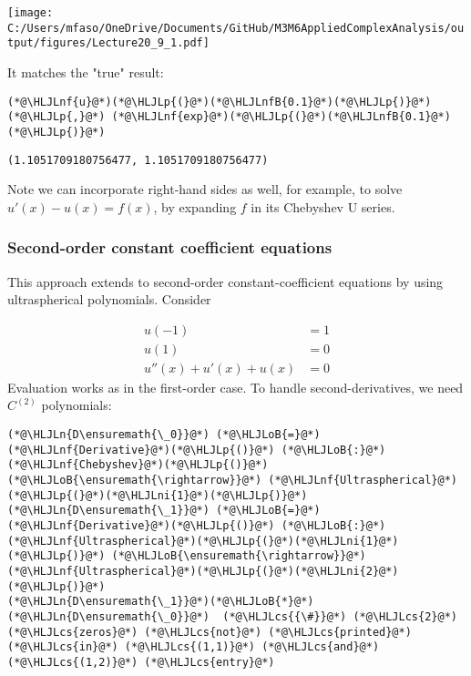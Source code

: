 \documentclass[12pt,a4paper]{article}
\newcommand{\HLJLn}[1]{#1}
\newcommand{\HLJLnf}[1]{\textcolor[RGB]{66,102,213}{#1}}
\newcommand{\HLJLnfB}[1]{\textcolor[RGB]{59,151,46}{#1}}
\newcommand{\HLJLni}[1]{\textcolor[RGB]{59,151,46}{#1}}
\newcommand{\HLJLoB}[1]{\textcolor[RGB]{102,102,102}{\textbf{#1}}}
\newcommand{\HLJLp}[1]{#1}
\newcommand{\HLJLcs}[1]{\textcolor[RGB]{153,153,119}{\textit{#1}}}
\begin{document}
\texttt{[image: C:/Users/mfaso/OneDrive/Documents/GitHub/M3M6AppliedComplexAnalysis/output/figures/Lecture20\_9\_1.pdf]}

It matches the "true" result:


\begin{lstlisting}
(*@\HLJLnf{u}@*)(*@\HLJLp{(}@*)(*@\HLJLnfB{0.1}@*)(*@\HLJLp{)}@*) (*@\HLJLp{,}@*) (*@\HLJLnf{exp}@*)(*@\HLJLp{(}@*)(*@\HLJLnfB{0.1}@*)(*@\HLJLp{)}@*)
\end{lstlisting}

\begin{lstlisting}
(1.1051709180756477, 1.1051709180756477)
\end{lstlisting}


Note we can incorporate right-hand sides as well, for example, to solve $u'(x) - u(x) = f(x)$, by expanding $f$ in its Chebyshev U series.

\subsubsection{Second-order constant coefficient equations}
This approach extends to second-order constant-coefficient equations by using ultraspherical polynomials.  Consider


\begin{align*}
u(-1) &= 1\\
u(1) &= 0\\
u''(x) + u'(x)  + u(x) &= 0
\end{align*}
Evaluation works as in the first-order case. To handle second-derivatives, we need $C^{(2)}$ polynomials:


\begin{lstlisting}
(*@\HLJLn{D\ensuremath{\_0}}@*) (*@\HLJLoB{=}@*) (*@\HLJLnf{Derivative}@*)(*@\HLJLp{()}@*) (*@\HLJLoB{:}@*) (*@\HLJLnf{Chebyshev}@*)(*@\HLJLp{()}@*) (*@\HLJLoB{\ensuremath{\rightarrow}}@*) (*@\HLJLnf{Ultraspherical}@*)(*@\HLJLp{(}@*)(*@\HLJLni{1}@*)(*@\HLJLp{)}@*)
(*@\HLJLn{D\ensuremath{\_1}}@*) (*@\HLJLoB{=}@*) (*@\HLJLnf{Derivative}@*)(*@\HLJLp{()}@*) (*@\HLJLoB{:}@*) (*@\HLJLnf{Ultraspherical}@*)(*@\HLJLp{(}@*)(*@\HLJLni{1}@*)(*@\HLJLp{)}@*) (*@\HLJLoB{\ensuremath{\rightarrow}}@*) (*@\HLJLnf{Ultraspherical}@*)(*@\HLJLp{(}@*)(*@\HLJLni{2}@*)(*@\HLJLp{)}@*)
(*@\HLJLn{D\ensuremath{\_1}}@*)(*@\HLJLoB{*}@*)(*@\HLJLn{D\ensuremath{\_0}}@*)  (*@\HLJLcs{{\#}}@*) (*@\HLJLcs{2}@*) (*@\HLJLcs{zeros}@*) (*@\HLJLcs{not}@*) (*@\HLJLcs{printed}@*) (*@\HLJLcs{in}@*) (*@\HLJLcs{(1,1)}@*) (*@\HLJLcs{and}@*) (*@\HLJLcs{(1,2)}@*) (*@\HLJLcs{entry}@*)
\end{lstlisting}
\end{document}
